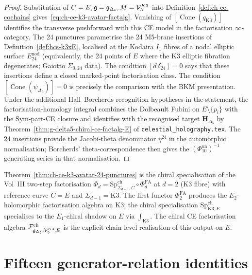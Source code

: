 \begin{proof}
Substitution of $C = E, \mathfrak{g} = \mathfrak{g}_{\Delta_5}, M = \mathcal{V}^{K3}_5$ into
Definition~\ref{def:ch-ce-cochains}
gives~\eqref{eq:ch-ce-k3-avatar-factalg}. Vanishing of
\([\operatorname{Cone}(q_{\mathrm{K3}})]\) identifies the transverse
pushforward with this CE model in the factorisation \(\infty\)-category.
The 24 punctures parametrise the 24 M5-brane insertions of
Definition~\ref{def:hcs-k3xE}, localised at the Kodaira $I_1$ fibres of
a nodal elliptic surface $E^{\mathrm{nod}}_{24}$ (equivalently, the 24
points of $E$ where the K3 elliptic fibration degenerates; Gaiotto
$\Sigma_{0,24}$ data). The condition \([d\,\delta_{24}]=0\) says that
these insertions define a closed marked-point factorisation class. The
condition \([\operatorname{Cone}(\psi_{\Delta_5})]=0\) is precisely the
comparison with the BKM presentation. Under the additional
Hall--Borcherds recognition hypotheses in the statement, the
factorisation-homology integral combines the Dolbeault Fubini on
$E\setminus\{p_i\}$ with the Sym-part-CE closure and identifies with the
recognised target $\mathbf H_{\Delta_5}$ by
Theorem~\ref{thm:g-delta5-chiral-ce-factalg-E} of
\texttt{celestial\_holography.tex}. The 24 insertions provide the
Jacobi-theta denominator $\eta^{24}$ in the automorphic normalisation;
Borcherds' theta-correspondence then gives the
\((\Phi_{10}^{\mathrm{un}})^{-1}\) generating series in that
normalisation.
\end{proof}

\begin{remark}
\label{rem:ch-ce-vol3-concordance}
%
Theorem~\ref{thm:ch-ce-k3-avatar-24-punctures} is the chiral
specialisation of the Vol~III two-step factorisation
$\Phi_d = \mathrm{Sp}^{\mathrm{ch}}_{\Sigma_{d-1},C}\circ\Phi^{\mathrm{FA}}_d$
at $d = 2$ (K3 fibre) with reference curve $C = E$ and
$\Sigma_{d-1} = \mathrm{K3}$. The first functor $\Phi^{\mathrm{FA}}_2$
produces the $E_2$-holomorphic factorisation algebra on K3; the chiral
specialisation
$\mathrm{Sp}^{\mathrm{ch}}_{\mathrm{K3},E}$ specialises to the
$E_1$-chiral shadow on $E$ via $\int_{\mathrm{K3}}$. The chiral CE
factorisation algebra $\mathcal{F}^{\mathrm{ch}}_{\mathfrak{g}_{\Delta_5}, \mathcal{V}^{K3}_5;
E}$ is the explicit chain-level realisation of this output on
$E$.
\end{remark}

\section{Fifteen generator-relation identities}
\label{sec:ch-ce-fifteen-identities}

